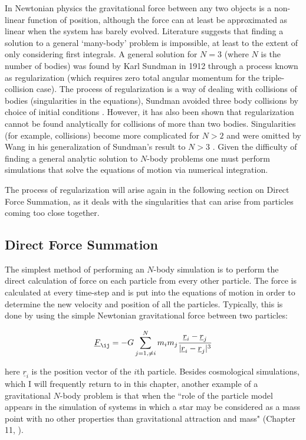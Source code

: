 In Newtonian physics the gravitational force between any two objects is a non-linear function of position, although the force can at least be approximated as linear when the system has barely evolved. Literature suggests that finding a solution to a general `many-body' problem is impossible, at least to the extent of only considering first integrals. A general solution for $N=3$ (where $N$ is the number of bodies) was found by Karl Sundman in 1912 through a process known as regularization (which requires zero total angular momentum for the triple-collision case). The process of regularization is a way of dealing with collisions of bodies (singularities in the equations), Sundman avoided three body collisions by choice of initial conditions \citep{bib_sund}. However, it has also been shown that regularization cannot be found analytically for collisions of more than two bodies. Singularities (for example, collisions) become more complicated for $N>2$ and were omitted by Wang in his generalization of Sundman's result to $N>3$ \citep{bib_wang}. Given the difficulty of finding a general analytic solution to $N$-body problems one must perform simulations that solve the equations of motion via numerical integration.

The process of regularization will arise again in the following section on Direct Force Summation, as it deals with the singularities that can arise from particles coming too close together.

\subsection{Direct Force Summation}
\label{sec.direct}
The simplest method of performing an $N$-body simulation is to perform the direct calculation of force on each particle from every other particle. The force is calculated at every time-step and is put into the equations of motion in order to determine the new velocity and position of all the particles. Typically, this is done by using the simple Newtonian gravitational force between two particles:

\begin{equation}
\label{eqn_fgr}
\underline{F}_{\ij} = -G \sum_{j = 1,\ne i}^N m_i m_j \frac{\underline{r}_i -\underline{r}_j}{|\underline{r}_i - \underline{r}_j|^3}
\end{equation}

\noindent here $\underline{r}_i$ is the position vector of the $i$th particle. Besides cosmological simulations, which I will frequently return to in this chapter, another example of a gravitational $N$-body problem is that when the ``role of the particle model appears in the simulation of systems in which a star may be considered as a mass point with no other properties than gravitational attraction and mass" (Chapter 11, \citet{bib_he}).


